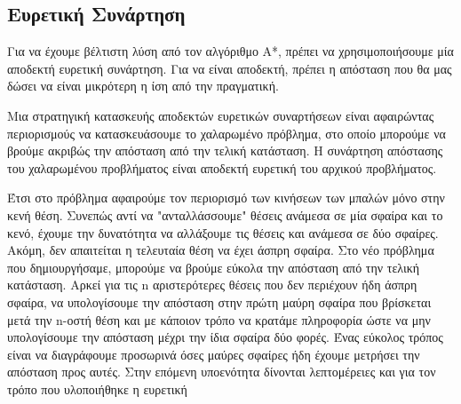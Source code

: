 \documentclass{article}
\begin{document}
\subsection*{Ευρετική Συνάρτηση}
Για να έχουμε βέλτιστη λύση από τον αλγόριθμο A*, πρέπει να χρησιμοποιήσουμε μία αποδεκτή ευρετική συνάρτηση. Για να είναι αποδεκτή, πρέπει η απόσταση που θα μας δώσει να είναι μικρότερη η ίση από την πραγματική. \par
Μια στρατηγική κατασκευής αποδεκτών ευρετικών συναρτήσεων είναι αφαιρώντας περιορισμούς να κατασκευάσουμε το χαλαρωμένο πρόβλημα, στο οποίο μπορούμε να βρούμε ακριβώς την απόσταση από την τελική κατάσταση. Η συνάρτηση απόστασης του χαλαρωμένου προβλήματος είναι αποδεκτή ευρετική του αρχικού προβλήματος.\par 
Έτσι στο πρόβλημα αφαιρούμε τον περιορισμό των κινήσεων των μπαλών μόνο στην κενή θέση. Συνεπώς αντί να "ανταλλάσσουμε" θέσεις ανάμεσα σε μία σφαίρα και το κενό, έχουμε την δυνατότητα να αλλάξουμε τις θέσεις και ανάμεσα σε δύο σφαίρες. Ακόμη, δεν απαιτείται η τελευταία θέση να έχει άσπρη σφαίρα. Στο νέο πρόβλημα που δημιουργήσαμε, μπορούμε να βρούμε εύκολα την απόσταση από την τελική κατάσταση. Αρκεί για τις n αριστερότερες θέσεις που δεν περιέχουν ήδη άσπρη σφαίρα, να υπολογίσουμε την απόσταση στην πρώτη μαύρη σφαίρα  που βρίσκεται μετά την n-οστή θέση και με κάποιον τρόπο να κρατάμε πληροφορία ώστε να μην υπολογίσουμε την απόσταση μέχρι την ίδια σφαίρα δύο φορές. Ένας εύκολος τρόπος είναι να διαγράφουμε προσωρινά όσες μαύρες σφαίρες ήδη έχουμε μετρήσει την απόσταση προς αυτές. Στην επόμενη υποενότητα δίνονται λεπτομέρειες και για τον τρόπο που υλοποιήθηκε η ευρετική
\end{document}
